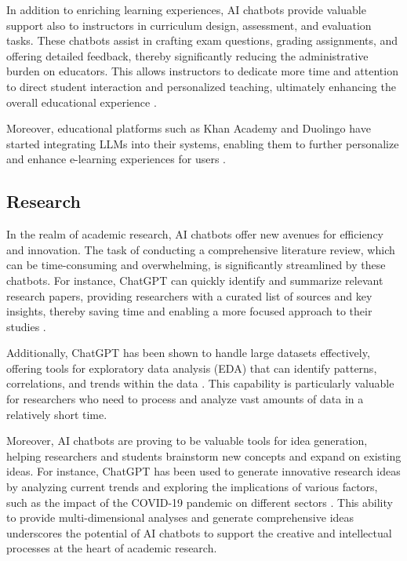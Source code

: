 In addition to enriching learning experiences, AI chatbots provide valuable support also to instructors in curriculum design, assessment, and evaluation tasks. These chatbots assist in crafting exam questions, grading assignments, and offering detailed feedback, thereby significantly reducing the administrative burden on educators. This allows instructors to dedicate more time and attention to direct student interaction and personalized teaching, ultimately enhancing the overall educational experience \cite{dam2024complete}.

Moreover, educational platforms such as Khan Academy and Duolingo have started integrating LLMs into their systems, enabling them to further personalize and enhance e-learning experiences for users \cite{khan2023harnessing, Duolingo2023}.

\subsection{Research}

In the realm of academic research, AI chatbots offer new avenues for efficiency and innovation. The task of conducting a comprehensive literature review, which can be time-consuming and overwhelming, is significantly streamlined by these chatbots. For instance, ChatGPT can quickly identify and summarize relevant research papers, providing researchers with a curated list of sources and key insights, thereby saving time and enabling a more focused approach to their studies \cite{chandha2023setting}.

Additionally, ChatGPT has been shown to handle large datasets effectively, offering tools for exploratory data analysis (EDA) that can identify patterns, correlations, and trends within the data \cite{jiang2023}. This capability is particularly valuable for researchers who need to process and analyze vast amounts of data in a relatively short time.

Moreover, AI chatbots are proving to be valuable tools for idea generation, helping researchers and students brainstorm new concepts and expand on existing ideas. For instance, ChatGPT has been used to generate innovative research ideas by analyzing current trends and exploring the implications of various factors, such as the impact of the COVID-19 pandemic on different sectors \cite{temsah2023reflection}. This ability to provide multi-dimensional analyses and generate comprehensive ideas underscores the potential of AI chatbots to support the creative and intellectual processes at the heart of academic research.

